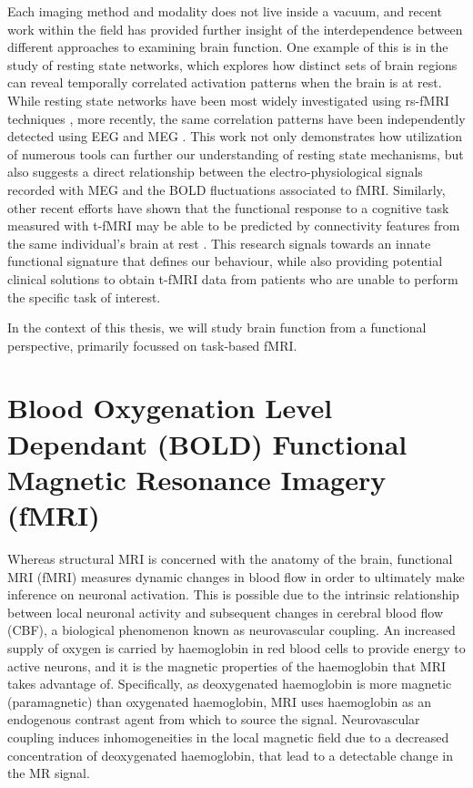 Each imaging method and modality does not live inside a vacuum, and recent work within the field has provided further insight of the interdependence between different approaches to examining brain function. One example of this is in the study of resting state networks, which explores how distinct sets of brain regions can reveal temporally correlated activation patterns when the brain is at rest. While resting state networks have been most widely investigated using rs-fMRI techniques \citep[e.g.][]{Smith2009-dm, Lee2012-di, Moussa2012-bl}, more recently, the same correlation patterns have been independently detected using EEG and MEG \citep{Brookes2011-cj, Fomina2015-ha}. This work not only demonstrates how utilization of numerous tools can further our understanding of resting state mechanisms, but also suggests a direct relationship between the electro-physiological signals recorded with MEG and the BOLD fluctuations associated to fMRI. Similarly, other recent efforts have shown that the functional response to a cognitive task measured with t-fMRI may be able to be predicted by connectivity features from the same individual's brain at rest \citep{Parker_Jones2017-ld, Tavor2016-pd}. This research signals towards an innate functional signature that defines our behaviour, while also providing potential clinical solutions to obtain t-fMRI data from patients who are unable to perform the specific task of interest.  

In the context of this thesis, we will study brain function from a functional perspective, primarily focussed on task-based fMRI. 

\section{Blood Oxygenation Level Dependant (BOLD) Functional Magnetic Resonance Imagery (fMRI)}

Whereas structural MRI is concerned with the anatomy of the brain, functional MRI (fMRI) measures dynamic changes in blood flow in order to ultimately make inference on neuronal activation. This is possible due to the intrinsic relationship between local neuronal activity and subsequent changes in cerebral blood flow (CBF), a biological phenomenon known as neurovascular coupling. An increased supply of oxygen is carried by haemoglobin in red blood cells to provide energy to active neurons, and it is the magnetic properties of the haemoglobin that MRI takes advantage of. Specifically, as deoxygenated haemoglobin is more magnetic (paramagnetic) than oxygenated haemoglobin, MRI uses haemoglobin as an endogenous contrast agent from which to source the signal. Neurovascular coupling induces inhomogeneities in the local magnetic field due to a decreased concentration of deoxygenated haemoglobin, that lead to a detectable change in the MR signal.

